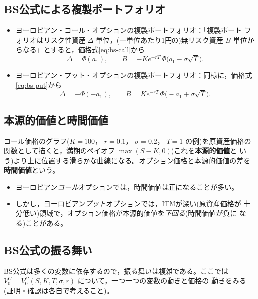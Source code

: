 \subsection{BS公式による複製ポートフォリオ}

\begin{itemize}
\item ヨーロピアン・コール・オプションの複製ポートフォリオ：「複製ポート
フォリオはリスク性資産 $\Delta$ 単位，(一単位あたり1円の)無リスク資産
$B$ 単位からなる」とすると，価格式\eqref{eq:bs-call}から
\begin{equation}
\Delta = \Phi(a_1),\qquad
B = -Ke^{-rT}\,\Phi\bigl(a_1 - \sigma\sqrt{T}\bigr).
\end{equation}
\item ヨーロピアン・プット・オプションの複製ポートフォリオ：同様に，価格式
\eqref{eq:bs-put}から
\begin{equation}
\Delta = -\Phi(-a_1),\qquad
B = Ke^{-rT}\,\Phi\bigl(-a_1 + \sigma\sqrt{T}\bigr).
\end{equation}
\end{itemize}

\subsection{本源的価値と時間価値}

コール価格のグラフ($K=100$， $r=0.1$， $\sigma=0.2$， $T=1$ の例)を原資産価格の
関数として描くと，満期のペイオフ $\max(S-K,0)$(これを\textbf{本源的価値}と
いう)より上に位置する滑らかな曲線になる。オプション価格と本源的価値の差を
\textbf{時間価値}という。

\begin{itemize}
\item ヨーロピアン\emph{コール}オプションでは，時間価値は正になることが多い。
\item しかし，ヨーロピアン\emph{プット}オプションでは，ITMが深い(原資産価格が
十分低い)領域で，オプション価格が本源的価値を\emph{下回る}(時間価値が負に
なる)ことがある。
\end{itemize}

\subsection{BS公式の振る舞い}

BS公式は多くの変数に依存するので，振る舞いは複雑である。ここでは
$V_0^C = V_0^C(S, K, T, \sigma, r)$ について，一つ一つの変数の動きと価格の
動きをみる(証明・確認は各自で考えること)。


